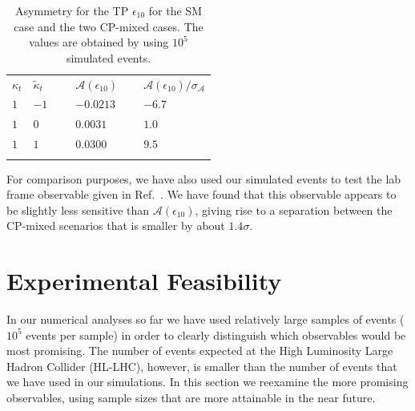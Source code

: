 \documentclass[aps,preprint,tightenlines,floatfix,superscriptaddress,nofootinbib,showpacs]{revtex4-1}
\begin{document}
%
\begin{table}[th]
\caption{Asymmetry for the TP $\epsilon_{10}$ for the SM case and the
  two $\mathrm{CP}$-mixed cases. The
  values are obtained by using $10^5$ simulated events.}
\label{table10}
\begin{center}
\begin{tabular}{|C{1cm}|C{1cm}||C{2cm}|C{2cm}|}
\hhline{|====|}
$\kappa_t$&$\tilde{\kappa}_t$~~&$\mathcal{A}(\epsilon_{10})$~~&$\mathcal{A}(\epsilon_{10})/\sigma_{\mathcal{A}}$ \\ 
\hhline{|====|} 
$1$ & $-1$~~~ & $-0.0213$~~~ & $-6.7$~~~ \\[0.6mm]
\hline
$1$ & $0$ & $0.0031$~ & $1.0$~ \\[0.6mm]
\hline
$1$ & $1$ & $0.0300$~ & $9.5$~ \\[0.6mm]
\hhline{|====|}
\end{tabular}
\end{center} 
\end{table}
%

For comparison purposes, we have also used our simulated events
to test the lab frame observable given
in Ref.~\cite{Guadagnoli}. We have found that this observable
appears to
be slightly less sensitive than $\mathcal{A}(\epsilon_{10})$,
giving rise to a separation between the $\mathrm{CP}$-mixed scenarios
that is smaller by about $1.4\sigma$.

%
\section{Experimental Feasibility}
\label{sec6}
%

In our numerical analyses so far we have used relatively large
samples of events ($10^5$ events per sample)
in order to clearly distinguish
which observables would be most promising.  
The number of events expected at the High Luminosity Large
Hadron Collider (HL-LHC), however, is
smaller than the number of events that we have used in our
simulations.  In this section we reexamine
the more promising observables, using sample sizes that are
more attainable in the near future.  
\end{document}
